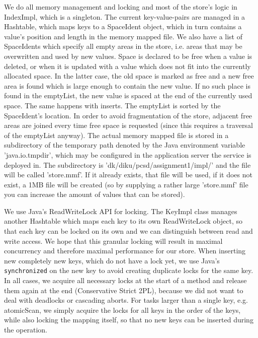 \documentclass[12pt,a4paper]{article}
\begin{document}
We do all memory management and locking and most of the store's logic in IndexImpl, which is a singleton. The current key-value-pairs are managed in a Hashtable, which maps keys to a SpaceIdent object, which in turn contains a value's position and length in the memory mapped file. We also have a list of SpaceIdents which specify all empty areas in the store, i.e. areas that may be overwritten and used by new values. Space is declared to be free when a value is deleted, or when it is updated with a value which does not fit into the currently allocated space. In the latter case, the old space is marked as free and a new free area is found which is large enough to contain the new value. If no such place is found in the emptyList, the new value is spaced at the end of the currently used space. The same happens with inserts. The emptyList is sorted by the SpaceIdent's location. In order to avoid fragmentation of the store, adjacent free areas are joined every time free space is requested (since this requires a traversal of the emptyList anyway). The actual memory mapped file is stored in a subdirectory of the temporary path denoted by the Java environment variable 'java.io.tmpdir', which may be configured in the application server the service is deployed in. The subdirectory is 'dk/diku/pcsd/assignment1/impl/' and the file will be called 'store.mmf'. If it already exists, that file will be used, if it does not exist, a 1MB file will be created (so by supplying a rather large 'store.mmf' file you can increase the amount of values that can be stored).

We use Java's ReadWriteLock API for locking. The KeyImpl class manages another Hashtable which maps each key to its own ReadWriteLock object, so that each key can be locked on its own and we can distinguish between read and write access. We hope that this granular locking will result in maximal concurrency and therefore maximal performance for our store. When inserting new completely new keys, which do not have a lock yet, we use Java's \texttt{synchronized} on the new key to avoid creating duplicate locks for the same key. In all cases, we acquire all necessary locks at the start of a method and release them again at the end (Conservative Strict 2PL), because we did not want to deal with deadlocks or cascading aborts. For tasks larger than a single key, e.g. atomicScan, we simply acquire the locks for all keys in the order of the keys, while also locking the mapping itself, so that no new keys can be inserted during the operation.
\end{document}
